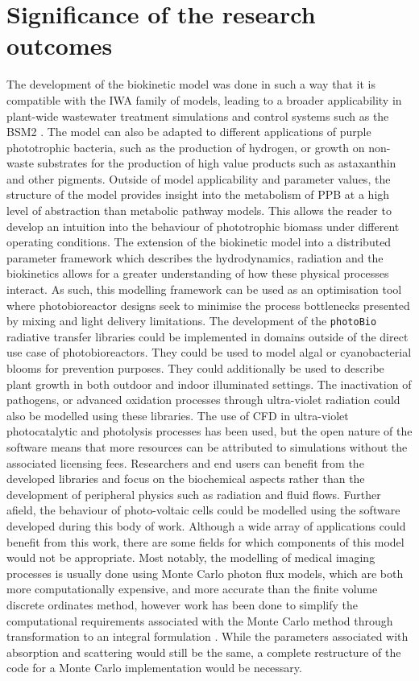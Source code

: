 \section{Significance of the research outcomes}
The development of the biokinetic model was done in such a way that it is compatible with the IWA family of models, leading to a broader applicability in plant-wide wastewater treatment simulations and control systems such as the BSM2 \cite{jeppsson2007}. The model can also be adapted to different applications of purple phototrophic bacteria, such as the production of hydrogen, or growth on non-waste substrates for the production of high value products such as astaxanthin and other pigments. Outside of model applicability and parameter values, the structure of the model provides insight into the metabolism of PPB at a high level of abstraction than metabolic pathway models. This allows the reader to develop an intuition into the behaviour of phototrophic biomass under different operating conditions. 
\skippingparagraph
The extension of the biokinetic model into a distributed parameter framework which describes the hydrodynamics, radiation and the biokinetics allows for a greater understanding of how these physical processes interact. As such, this modelling framework can be used as an optimisation tool where photobioreactor designs seek to minimise the process bottlenecks presented by mixing and light delivery limitations. The development of the \texttt{photoBio} radiative transfer libraries could be implemented in domains outside of the direct use case of photobioreactors. They could be used to model algal or cyanobacterial blooms for prevention purposes. They could additionally be used to describe plant growth in both outdoor and indoor illuminated settings. The inactivation of pathogens, or advanced oxidation processes through ultra-violet radiation could also be modelled using these libraries. The use of CFD in ultra-violet photocatalytic and photolysis processes has been used, but the open nature of the software means that more resources can be attributed to simulations without the associated licensing fees. Researchers and end users can benefit from the developed libraries and focus on the biochemical aspects rather than the development of peripheral physics such as radiation and fluid flows. Further afield, the behaviour of photo-voltaic cells could be modelled using the software developed during this body of work. Although a wide array of applications could benefit from this work, there are some fields for which components of this model would not be appropriate. Most notably, the modelling of medical imaging processes is usually done using Monte Carlo photon flux models, which are both more computationally expensive, and more accurate than the finite volume discrete ordinates method\cite{kong2014}, however work has been done to simplify the computational requirements associated with the Monte Carlo method through transformation to an integral formulation \cite{dauchet2013}. While the parameters associated with absorption and scattering would still be the same, a complete restructure of the code for a Monte Carlo implementation would be necessary.
